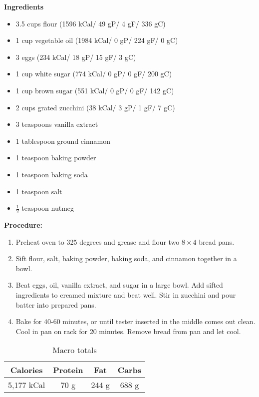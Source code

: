 \begin{multicols}{2}
\textbf{Ingredients}
\begin{itemize}
\item 3.5 cups flour \quad (1596 kCal/ 49 gP/ 4 gF/ 336 gC)
\item 1 cup vegetable oil (1984 kCal/ 0 gP/ 224 gF/ 0 gC)
\item 3 eggs  \quad (234 kCal/ 18 gP/ 15 gF/ 3 gC)
\item 1 cup white sugar (774 kCal/ 0 gP/ 0 gF/ 200 gC)
\item 1 cup brown sugar \quad (551 kCal/ 0 gP/ 0 gF/ 142 gC)
\item 2 cups grated zucchini \quad (38 kCal/ 3 gP/ 1 gF/ 7 gC)
\item 3 teaspoons vanilla extract 
\item 1 tablespoon ground cinnamon
\item 1 teaspoon baking powder
\item 1 teaspoon baking soda 
\item 1 teaspoon salt
\item $\frac{1}{2}$ teaspoon nutmeg



\end{itemize}


\columnbreak
\textbf{Procedure:}
\medskip


\begin{enumerate}
\item Preheat oven to 325 degrees and grease and flour two $8\times4$ bread pans.


\medskip
\item Sift flour, salt, baking powder, baking soda, and cinnamon together in a bowl. 
\medskip

\item Beat eggs, oil, vanilla extract, and sugar in a large bowl. Add sifted ingredients to creamed mixture and beat well. Stir in zucchini and pour batter into prepared pans. 
\newline 

 \item Bake for 40-60 minutes, or until tester inserted in the middle comes out clean. Cool in pan on rack for 20 minutes. Remove bread from pan and let cool.   
\end{enumerate}
\begin{table}[H]
  \begin{center}
    \caption{Macro totals}
    \label{tab:table1}
    \begin{tabular}{c|c|c|c} %
      \textbf{Calories} & \textbf{Protein} & \textbf{Fat} & \textbf{Carbs}\\
      \hline
      5,177 kCal & 70 g & 244 g & 688 g\\
    \end{tabular}
  \end{center}
\end{table}
\end{multicols}



